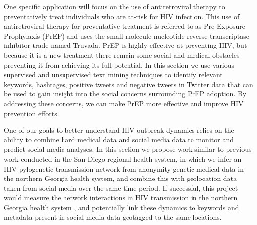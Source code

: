 



One specific application will focus on the use of antiretroviral therapy to preventatively treat individuals who are at-risk for HIV infection. This use of antiretroviral therapy for preventative treatment is referred to as Pre-Exposure Prophylaxis (PrEP) and uses the small molecule nucleotide reverse transcriptase inhibitor trade named Truvada. PrEP is highly effective at preventing HIV, but because it is a new treatment there remain some social and medical obstacles preventing it from achieving its full potential. In this section we use various supervised and unsupervised text mining techniques to identify relevant keywords, hashtages, positive tweets and negative tweets in Twitter data that can be used to gain insight into the social concerns surrounding PrEP adoption. By addressing these concerns, we can make PrEP more effective and improve HIV prevention efforts.

One of our goals to better understand HIV outbreak dynamics relies on the ability to combine hard medical data and social media data to monitor and predict social media analyses. In this section we propose work similar to previous work conducted in the San Diego regional health system, in which we infer an HIV pylogenetic transmission network from anonymity genetic medical data in the northern Georgia health system, and combine this with geolocation data taken from social media over the same time period. If successful, this project would measure the network interactions in HIV transmission in the northern Georgia health system , and potentially link these dynamics to keywords and metadata present in social media data geotagged to the same locations.


